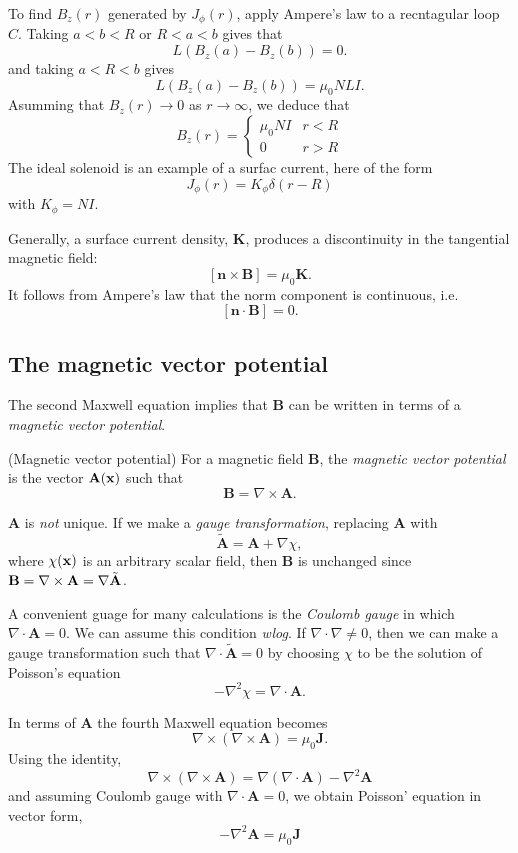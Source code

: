 \documentclass{article}
\begin{document}
\par
To find $ B_z(r) $ generated by $ J_\phi(r) $, apply Ampere's law to a recntagular loop $ C $. Taking $ a<b<R $ or $ R<a<b $ gives that
\[
  L(B_z(a)-B_z(b)) = 0.
\]
and taking $ a<R<b $ gives
\[
  L(B_z(a)-B_z(b)) = \mu_0 NLI.
\]
Asumming that $ B_z(r)\to 0 $ as $ r\to\infty $, we deduce that
\[
 B_z(r) = \begin{cases}
	 \mu_0 NI & r< R \\
	 0 & r> R
 \end{cases}   
\]
The ideal solenoid is an example of a surfac current, here of the form
\[
  J_\phi(r) = K_\phi \delta(r-R)
\]
with $ K_\phi = NI $.\par
Generally, a surface current density, $ \mathbf K $, produces a discontinuity in the tangential magnetic field:
\[
	[\mathbf n \times \mathbf B] = \mu_0 \mathbf K.
\]
It follows from Ampere's law that the norm component is continuous, i.e.
\[
	[\mathbf n \cdot\mathbf B] = 0.
\]
\subsection{The magnetic vector potential}
The second Maxwell equation implies that $ \mathbf B $ can be written in terms of a \textit{magnetic vector potential}.
\begin{definition}
	(Magnetic vector potential) For a magnetic field $ \mathbf B $, the \textit{magnetic vector potential} is the vector $ \mathbf A(\mathbf{x}) $ such that
	\[
	  \mathbf B = \nabla\times \mathbf A.
	\]
\end{definition}
\begin{remark}
	$ \mathbf A $ is \textit{not} unique. If we make a \textit{gauge transformation}, replacing $ \mathbf A $ with 
	\[
		\tilde{\mathbf A} = \mathbf A +\nabla\chi,
	\]
	where $ \chi(\mathbf{x}) $ is an arbitrary scalar field, then $ \mathbf B $ is unchanged since $ \mathbf B = \nabla\times \mathbf A = \nabla\time\times \tilde{\mathbf A} $. \par
	A convenient guage for many calculations is the \textit{Coulomb gauge} in which $ \nabla\cdot \mathbf A = 0 $. We can assume this condition \textit{wlog}. If $ \nabla\cdot \nabla\ne 0 $, then we can make a gauge transformation such that $ \nabla\cdot\tilde{\mathbf A} = 0 $ by choosing $ \chi $ to be the solution of Poisson's equation
	\[
	  -\nabla^2 \chi = \nabla\cdot\mathbf A.
	\]
\end{remark}
In terms of $ \mathbf A $ the fourth Maxwell equation becomes
\[
  \nabla\times(\nabla \times\mathbf A ) = \mu_0 \mathbf J.
\]
Using the identity,
\[
  \nabla\times(\nabla\times \mathbf A) = \nabla(\nabla\cdot \mathbf A) - \nabla^2 \mathbf A
\]
and assuming Coulomb gauge with $ \nabla\cdot\mathbf A =0 $, we obtain Poisson' equation in vector form,
\[
  -\nabla^2 \mathbf A = \mu_0 \mathbf J
\]
\end{document}
